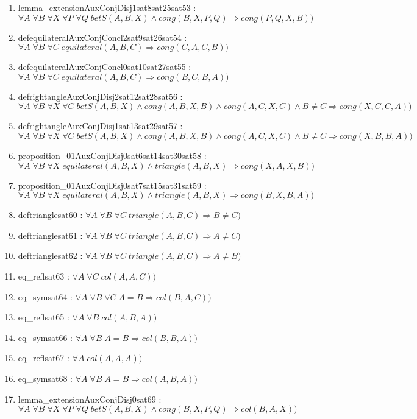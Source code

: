 \documentclass{article}
\begin{document}
\begin{enumerate}
\item lemma\_extensionAuxConjDisj1sat8sat25sat53 : $\forall A\;\forall B\;\forall X\;\forall P\;\forall Q\;betS(A, B, X)\wedge cong(B, X, P, Q) \Rightarrow cong(P, Q, X, B))$
\item defequilateralAuxConjConcl2sat9sat26sat54 : $\forall A\;\forall B\;\forall C\;equilateral(A, B, C) \Rightarrow cong(C, A, C, B))$
\item defequilateralAuxConjConcl0sat10sat27sat55 : $\forall A\;\forall B\;\forall C\;equilateral(A, B, C) \Rightarrow cong(B, C, B, A))$
\item defrightangleAuxConjDisj2sat12sat28sat56 : $\forall A\;\forall B\;\forall X\;\forall C\;betS(A, B, X)\wedge cong(A, B, X, B)\wedge cong(A, C, X, C)\wedge B \neq C \Rightarrow cong(X, C, C, A))$
\item defrightangleAuxConjDisj1sat13sat29sat57 : $\forall A\;\forall B\;\forall X\;\forall C\;betS(A, B, X)\wedge cong(A, B, X, B)\wedge cong(A, C, X, C)\wedge B \neq C \Rightarrow cong(X, B, B, A))$
\item proposition\_01AuxConjDisj0sat6sat14sat30sat58 : $\forall A\;\forall B\;\forall X\;equilateral(A, B, X)\wedge triangle(A, B, X) \Rightarrow cong(X, A, X, B))$
\item proposition\_01AuxConjDisj0sat7sat15sat31sat59 : $\forall A\;\forall B\;\forall X\;equilateral(A, B, X)\wedge triangle(A, B, X) \Rightarrow cong(B, X, B, A))$
\item deftrianglesat60 : $\forall A\;\forall B\;\forall C\;triangle(A, B, C) \Rightarrow B \neq C)$
\item deftrianglesat61 : $\forall A\;\forall B\;\forall C\;triangle(A, B, C) \Rightarrow A \neq C)$
\item deftrianglesat62 : $\forall A\;\forall B\;\forall C\;triangle(A, B, C) \Rightarrow A \neq B)$
\item eq\_reflsat63 : $\forall A\;\forall C\;col(A, A, C))$
\item eq\_symsat64 : $\forall A\;\forall B\;\forall C\;A = B \Rightarrow col(B, A, C))$
\item eq\_reflsat65 : $\forall A\;\forall B\;col(A, B, A))$
\item eq\_symsat66 : $\forall A\;\forall B\;A = B \Rightarrow col(B, B, A))$
\item eq\_reflsat67 : $\forall A\;col(A, A, A))$
\item eq\_symsat68 : $\forall A\;\forall B\;A = B \Rightarrow col(A, B, A))$
\item lemma\_extensionAuxConjDisj0sat69 : $\forall A\;\forall B\;\forall X\;\forall P\;\forall Q\;betS(A, B, X)\wedge cong(B, X, P, Q) \Rightarrow col(B, A, X))$

\end{enumerate}
\end{document}
